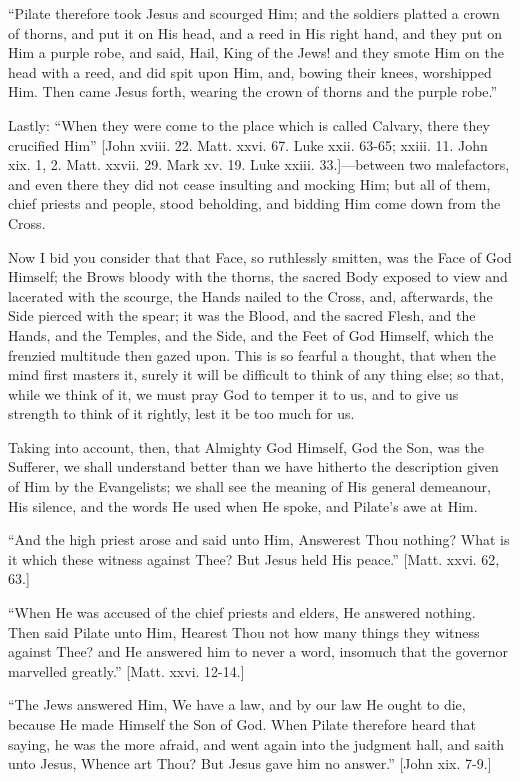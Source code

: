 ``Pilate therefore took Jesus and scourged Him; and the soldiers
platted a crown of thorns, and put it on His head, and a reed in His
right hand, and they put on Him a purple robe, and said, Hail, King of
the Jews! and they smote Him on the head with a reed, and did spit upon
Him, and, bowing their knees, worshipped Him. Then came Jesus forth,
wearing the crown of thorns and the purple robe.''

Lastly: ``When they were come to the place which is called
Calvary, there they crucified Him'' [John xviii. 22. Matt. xxvi. 67.
Luke xxii. 63-65; xxiii. 11. John xix. 1, 2. Matt. xxvii. 29. Mark xv.
19. Luke xxiii. 33.]—between two malefactors, and even there they did
not cease insulting and mocking Him; but all of them, chief priests and
people, stood beholding, and bidding Him come down from the Cross.

Now I bid you consider that that Face, so ruthlessly smitten, was the
Face of God Himself; the Brows bloody with the thorns, the sacred Body
exposed to view and lacerated with the scourge, the Hands nailed to the
Cross, and, afterwards, the Side pierced with the spear; it was the
Blood, and the sacred Flesh, and the Hands, and the Temples, and the
Side, and the Feet of God Himself, which the frenzied multitude then
gazed upon. This is so fearful a thought, that when the mind first
masters it, surely it will be difficult to think of any thing else; so
that, while we think of it, we must pray God to temper it to us, and to
give us strength to think of it rightly, lest it be too much for us.

Taking into account, then, that Almighty God Himself, God the Son,
was the Sufferer, we shall understand better than we have hitherto the
description given of Him by the Evangelists; we shall see the meaning of
His general demeanour, His silence, and the words He used when He spoke,
and Pilate's awe at Him.

``And the high priest arose and said unto Him, Answerest Thou
nothing? What is it which these witness against Thee? But Jesus held His
peace.'' [Matt. xxvi. 62, 63.]

``When He was accused of the chief priests and elders, He
answered nothing. Then said Pilate unto Him, Hearest Thou not how many
things they witness against Thee? and He answered him to never a word,
insomuch that the governor marvelled greatly.'' [Matt. xxvi. 12-14.]

``The Jews answered Him, We have a law, and by our law He ought
to die, because He made Himself the Son of God. When Pilate therefore
heard that saying, he was the more afraid, and went again into the
judgment hall, and saith unto Jesus, Whence art Thou? But Jesus gave him
no answer.'' [John xix. 7-9.]

